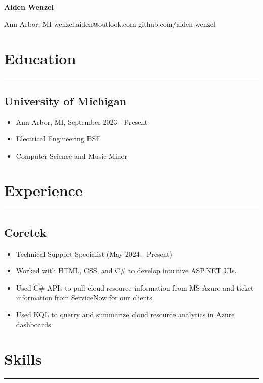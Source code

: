 \documentclass[10pt, letterpaper]{article}
\begin{document}
\thispagestyle{empty}
\begin{center}
	\textbf{\huge{Aiden Wenzel}}
	\vspace{3pt}
	
	Ann Arbor, MI \hspace{5pt} wenzel.aiden@outlook.com \hspace{5pt} github.com/aiden-wenzel
\end{center}

\section*{Education}
\hrule
\vspace{7pt}

\subsection*{University of Michigan}
\begin{itemize}[noitemsep]
	\item Ann Arbor, MI, September 2023 - Present
	\item Electrical Engineering BSE
	\item Computer Science and Music Minor
\end{itemize}

\section*{Experience}
\hrule
\vspace{7pt}

\subsection*{Coretek}
\begin{itemize}[noitemsep]
	\item Technical Support Specialist (May 2024 - Present)
	\item Worked with HTML, CSS, and C\# to develop intuitive ASP.NET UIs.
	\item Used C\# APIs to pull cloud resource information from MS Azure and ticket information from ServiceNow for our clients.
	\item Used KQL to querry and summarize cloud resource analytics in Azure dashboards.
\end{itemize}

\section*{Skills}
\hrule
\vspace{7pt}
\end{document}
